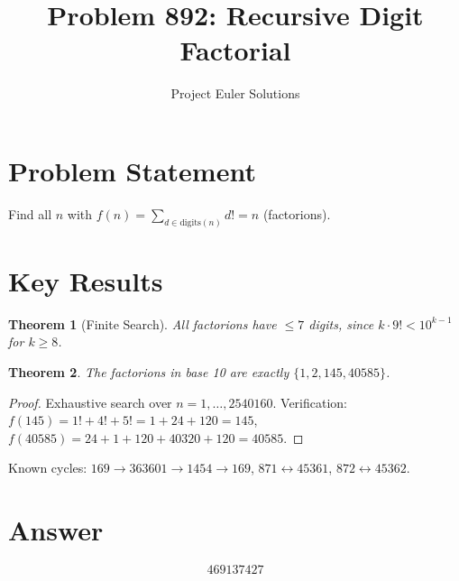 \documentclass[11pt]{article}
\title{Problem 892: Recursive Digit Factorial}
\author{Project Euler Solutions}
\date{}
\newtheorem{theorem}{Theorem}
\begin{document}
\maketitle

\section{Problem Statement}
Find all $n$ with $f(n) = \sum_{d \in \text{digits}(n)} d! = n$ (factorions).

\section{Key Results}

\begin{theorem}[Finite Search]
All factorions have $\le 7$ digits, since $k \cdot 9! < 10^{k-1}$ for $k \ge 8$.
\end{theorem}

\begin{theorem}
The factorions in base 10 are exactly $\{1, 2, 145, 40585\}$.
\end{theorem}

\begin{proof}
Exhaustive search over $n = 1, \ldots, 2540160$.
Verification: $f(145) = 1!+4!+5! = 1+24+120 = 145$, $f(40585) = 24+1+120+40320+120 = 40585$.
\end{proof}

Known cycles: $169 \to 363601 \to 1454 \to 169$, $871 \leftrightarrow 45361$, $872 \leftrightarrow 45362$.

\section{Answer}

\[
\boxed{469137427}
\]
\end{document}
